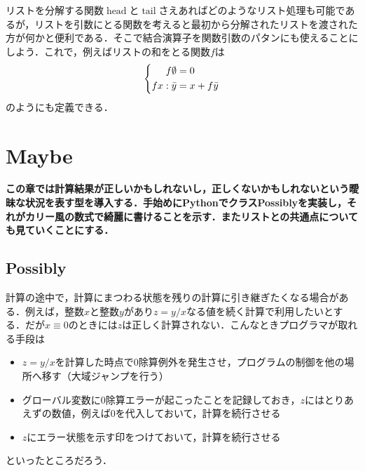 \documentclass[twocolumn]{jsbook}
\newenvironment{leader}{\begingroup\bf}{\endgroup}
\DeclareMathOperator{\hsklHead}{head}
\DeclareMathOperator{\hsklTail}{tail}
\newcommand{\hsklEmptyList}{\emptyset}
\newcommand{\hsklList}[1]{\Bar{#1}}
\begin{document}
リストを分解する関数$\hsklHead$と$\hsklTail$さえあればどのようなリスト処理も可能であるが，リストを引数にとる関数を考えると最初から分解されたリストを渡された方が何かと便利である．そこで結合演算子を関数引数のパタンにも使えることにしよう．これで，例えばリストの和をとる関数$f$は
\begin{equation*}
\left\{
\begin{split}
f\hsklEmptyList&=0\\
fx:\hsklList{y}&=x+f\hsklList{y}
\end{split}
\right.
\end{equation*}
のようにも定義できる．


\chapter{Maybe}

\begin{leader}
この章では計算結果が正しいかもしれないし，正しくないかもしれないという曖昧な状況を表す型を導入する．手始めにPythonでクラスPossiblyを実装し，それがカリー風の数式で綺麗に書けることを示す．またリストとの共通点についても見ていくことにする．
\end{leader}

\section{Possibly}

計算の途中で，計算にまつわる状態を残りの計算に引き継ぎたくなる場合がある．例えば，整数$x$と整数$y$があり$z=y/x$なる値を続く計算で利用したいとする．だが$x\equiv0$のときには$z$は正しく計算されない．こんなときプログラマが取れる手段は
\begin{itemize}
\item $z=y/x$を計算した時点で$0$除算例外を発生させ，プログラムの制御を他の場所へ移す（大域ジャンプを行う）
\item グローバル変数に$0$除算エラーが起こったことを記録しておき，$z$にはとりあえずの数値，例えば$0$を代入しておいて，計算を続行させる
\item $z$にエラー状態を示す印をつけておいて，計算を続行させる
\end{itemize}
といったところだろう．
\end{document}
